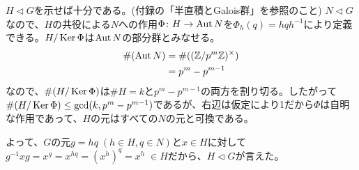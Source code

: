 \newpage





\subsubsection{} %
\begin{sol}
  $H \lhd G$を示せば十分である。(付録の「半直積とGalois群」を参照のこと) $N \lhd G$なので、$H$の共役による$N$への作用$\Phi \colon H \rightarrow \operatorname{Aut} N$を$\Phi_h(q)=hqh^{-1}$により定義できる。$H / \operatorname{Ker} \Phi$は$\operatorname{Aut} N$の部分群とみなせる。
  \begin{align*}
    \#(\operatorname{Aut} N) &= \#(({\mathbb Z}/ p^m {\mathbb Z})^{\times}) \\
    &= p^m - p^{m-1}
  \end{align*}
  なので、$\#(H / \operatorname{Ker} \Phi)$は$\# H= k$と$ p^m - p^{m-1}$の両方を割り切る。したがって$\#(H / \operatorname{Ker} \Phi) \leq \gcd (k,p^m - p^{m-1})$であるが、右辺は仮定により1だから$\Phi$は自明な作用であって、$H$の元はすべての$N$の元と可換である。

  よって、$G$の元$g=hq \; (h \in H, q \in N)$と$x \in H$に対して$g^{-1}xg = x^g =x^{hq} = (x^h)^q = x^h \; \in H$だから、$H \lhd G$が言えた。
\end{sol}

\newpage


